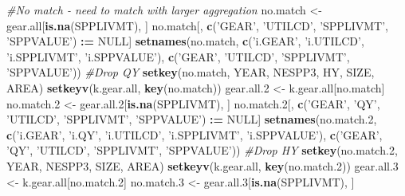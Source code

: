 \documentclass[]{article}
\newenvironment{Shaded}{\begin{snugshade}}{\end{snugshade}}
\newcommand{\KeywordTok}[1]{\textcolor[rgb]{0.13,0.29,0.53}{\textbf{#1}}}
\newcommand{\DecValTok}[1]{\textcolor[rgb]{0.00,0.00,0.81}{#1}}
\newcommand{\StringTok}[1]{\textcolor[rgb]{0.31,0.60,0.02}{#1}}
\newcommand{\CommentTok}[1]{\textcolor[rgb]{0.56,0.35,0.01}{\textit{#1}}}
\newcommand{\OtherTok}[1]{\textcolor[rgb]{0.56,0.35,0.01}{#1}}
\newcommand{\OperatorTok}[1]{\textcolor[rgb]{0.81,0.36,0.00}{\textbf{#1}}}
\newcommand{\ErrorTok}[1]{\textcolor[rgb]{0.64,0.00,0.00}{\textbf{#1}}}
\newcommand{\NormalTok}[1]{#1}
\begin{document}
\begin{Shaded}
\begin{Highlighting}[]
  \CommentTok{#No match - need to match with larger aggregation}
\NormalTok{  no.match  <-}\StringTok{ }\NormalTok{gear.all[}\KeywordTok{is.na}\NormalTok{(SPPLIVMT), ]}
\NormalTok{  no.match[, }\KeywordTok{c}\NormalTok{(}\StringTok{'GEAR'}\NormalTok{, }\StringTok{'UTILCD'}\NormalTok{, }\StringTok{'SPPLIVMT'}\NormalTok{, }\StringTok{'SPPVALUE'}\NormalTok{) }\OperatorTok{:}\ErrorTok{=}\StringTok{ }\OtherTok{NULL}\NormalTok{]}
  \KeywordTok{setnames}\NormalTok{(no.match, }\KeywordTok{c}\NormalTok{(}\StringTok{'i.GEAR'}\NormalTok{, }\StringTok{'i.UTILCD'}\NormalTok{, }\StringTok{'i.SPPLIVMT'}\NormalTok{, }\StringTok{'i.SPPVALUE'}\NormalTok{), }
           \KeywordTok{c}\NormalTok{(}\StringTok{'GEAR'}\NormalTok{, }\StringTok{'UTILCD'}\NormalTok{, }\StringTok{'SPPLIVMT'}\NormalTok{, }\StringTok{'SPPVALUE'}\NormalTok{))}
  \CommentTok{#Drop QY}
  \KeywordTok{setkey}\NormalTok{(no.match, YEAR, NESPP3, HY, SIZE, AREA)}
  \KeywordTok{setkeyv}\NormalTok{(k.gear.all, }\KeywordTok{key}\NormalTok{(no.match))}
\NormalTok{  gear.all.}\DecValTok{2}\NormalTok{ <-}\StringTok{ }\NormalTok{k.gear.all[no.match]}
\NormalTok{  no.match.}\DecValTok{2}\NormalTok{ <-}\StringTok{ }\NormalTok{gear.all.}\DecValTok{2}\NormalTok{[}\KeywordTok{is.na}\NormalTok{(SPPLIVMT), ]}
\NormalTok{  no.match.}\DecValTok{2}\NormalTok{[, }\KeywordTok{c}\NormalTok{(}\StringTok{'GEAR'}\NormalTok{, }\StringTok{'QY'}\NormalTok{, }\StringTok{'UTILCD'}\NormalTok{, }\StringTok{'SPPLIVMT'}\NormalTok{, }\StringTok{'SPPVALUE'}\NormalTok{) }\OperatorTok{:}\ErrorTok{=}\StringTok{ }\OtherTok{NULL}\NormalTok{]}
  \KeywordTok{setnames}\NormalTok{(no.match.}\DecValTok{2}\NormalTok{, }\KeywordTok{c}\NormalTok{(}\StringTok{'i.GEAR'}\NormalTok{, }\StringTok{'i.QY'}\NormalTok{, }\StringTok{'i.UTILCD'}\NormalTok{, }\StringTok{'i.SPPLIVMT'}\NormalTok{, }\StringTok{'i.SPPVALUE'}\NormalTok{), }
           \KeywordTok{c}\NormalTok{(}\StringTok{'GEAR'}\NormalTok{, }\StringTok{'QY'}\NormalTok{, }\StringTok{'UTILCD'}\NormalTok{, }\StringTok{'SPPLIVMT'}\NormalTok{, }\StringTok{'SPPVALUE'}\NormalTok{))}
  \CommentTok{#Drop HY}
  \KeywordTok{setkey}\NormalTok{(no.match.}\DecValTok{2}\NormalTok{, YEAR, NESPP3, SIZE, AREA)}
  \KeywordTok{setkeyv}\NormalTok{(k.gear.all, }\KeywordTok{key}\NormalTok{(no.match.}\DecValTok{2}\NormalTok{))}
\NormalTok{  gear.all.}\DecValTok{3}\NormalTok{ <-}\StringTok{ }\NormalTok{k.gear.all[no.match.}\DecValTok{2}\NormalTok{]}
\NormalTok{  no.match.}\DecValTok{3}\NormalTok{ <-}\StringTok{ }\NormalTok{gear.all.}\DecValTok{3}\NormalTok{[}\KeywordTok{is.na}\NormalTok{(SPPLIVMT), ]}

\end{Highlighting}
\end{Shaded}
\end{document}

